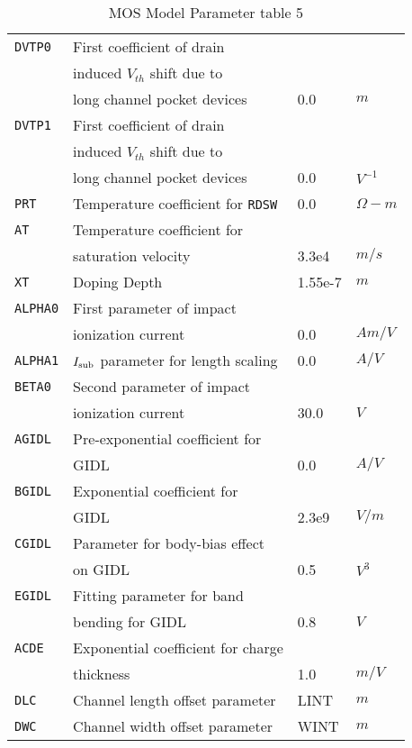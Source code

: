 \documentclass{article}
\begin{document}
\begin{table}[H]
\begin{tabular}{|l| l| l| l|}
\texttt{DVTP0} & First coefficient of drain & & \\
               &induced $V_{th}$ shift due to & & \\
               & long channel pocket devices & 0.0 & $m$\\
\texttt{DVTP1} & First coefficient of drain & & \\
               & induced $V_{th}$ shift due to & & \\
               & long channel pocket devices & 0.0 & $V^{-1}$\\
\texttt{PRT} & Temperature coefficient for \texttt{RDSW} & 0.0 & $\Omega - m$\\
\texttt{AT} & Temperature coefficient for & & \\
            & saturation velocity & 3.3e4 & $m/s$\\
\texttt{XT} & Doping Depth & 1.55e-7 & $m$\\
\texttt{ALPHA0} & First parameter of impact & & \\
                &ionization current & 0.0 & $Am/V$\\
\texttt{ALPHA1} & $I_{\rm{sub}}$ parameter for length scaling & 0.0 & $A/V$\\
\texttt{BETA0} & Second parameter of impact & & \\
               & ionization current & 30.0 & $V$\\
\texttt{AGIDL} & Pre-exponential coefficient for & & \\
               & GIDL & 0.0 & $A/V$\\
\texttt{BGIDL} & Exponential coefficient for & & \\
               & GIDL & 2.3e9 & $V/m$\\
\texttt{CGIDL} & Parameter for body-bias effect & & \\
               & on GIDL & 0.5 & $V^3$\\
\texttt{EGIDL} & Fitting parameter for band & & \\
               & bending for GIDL & 0.8 & $V$\\
\texttt{ACDE} & Exponential coefficient for charge & & \\
              & thickness & 1.0 & $m/V$\\
\texttt{DLC} & Channel length offset parameter & LINT & $m$\\
\texttt{DWC} & Channel width offset parameter & WINT & $m$\\
\hline
\end{tabular}
\caption{\label{bsim4.params5} MOS Model Parameter table 5}
\end{table}
\end{document}

